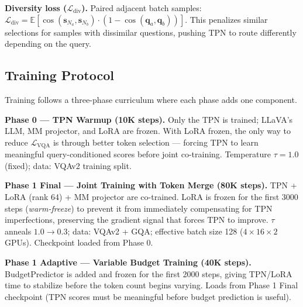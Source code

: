 \documentclass{article}
\newcommand{\qemb}{\mathbf{q}}
\newcommand{\sN}{\mathbf{s}_N}
\begin{document}
\textbf{Diversity loss ($\mathcal{L}_\mathrm{div}$).}
Paired adjacent batch samples: $\mathcal{L}_\mathrm{div} = \mathbb{E}[\cos(\sN_a,\sN_b) \cdot
(1 - \cos(\qemb_a, \qemb_b))]$.
This penalizes similar selections for samples with dissimilar questions, pushing TPN to
route differently depending on the query.

\subsection{Training Protocol}
\label{sec:training}

Training follows a three-phase curriculum where each phase adds one component.

\textbf{Phase 0 — TPN Warmup (10K steps).}
Only the TPN is trained; LLaVA's LLM, MM projector, and LoRA are frozen.
With LoRA frozen, the only way to reduce $\mathcal{L}_\mathrm{VQA}$ is through
better token selection — forcing TPN to learn meaningful query-conditioned scores
before joint co-training.
Temperature $\tau = 1.0$ (fixed); data: VQAv2 training split.

\textbf{Phase 1 Final — Joint Training with Token Merge (80K steps).}
TPN + LoRA (rank 64) + MM projector are co-trained.
LoRA is frozen for the first 3000 steps (\emph{warm-freeze}) to prevent it from
immediately compensating for TPN imperfections, preserving the gradient signal that
forces TPN to improve.
$\tau$ anneals $1.0 \to 0.3$; data: VQAv2 + GQA; effective batch size 128
($4 \times 16 \times 2$ GPUs).
Checkpoint loaded from Phase 0.

\textbf{Phase 1 Adaptive — Variable Budget Training (40K steps).}
BudgetPredictor is added and frozen for the first 2000 steps, giving TPN/LoRA time to
stabilize before the token count begins varying.
Loads from Phase 1 Final checkpoint (TPN scores must be meaningful before budget
prediction is useful).
\end{document}
